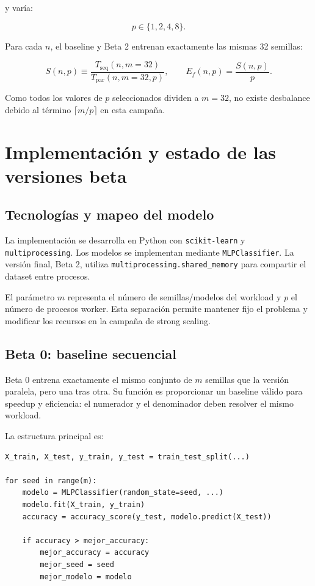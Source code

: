 \documentclass[11pt,a4paper]{article}
\newcommand{\Speedup}{S}
\newcommand{\Efficiency}{E_f}
\begin{document}
y varía:

\begin{equation}
    p\in\{1,2,4,8\}.
\end{equation}

Para cada $n$, el baseline y Beta 2 entrenan exactamente las mismas 32 semillas:

\begin{equation}
    \Speedup(n,p)
    \equiv
    \frac{T_{\mathrm{seq}}(n,m=32)}
         {T_{\mathrm{par}}(n,m=32,p)},
    \qquad
    \Efficiency(n,p)
    =
    \frac{\Speedup(n,p)}{p}.
    \label{eq:speedup-final}
\end{equation}

Como todos los valores de $p$ seleccionados dividen a $m=32$, no existe desbalance
debido al término $\lceil m/p\rceil$ en esta campaña.


\section{Implementación y estado de las versiones beta}

\subsection{Tecnologías y mapeo del modelo}

La implementación se desarrolla en Python con \texttt{scikit-learn} y
\texttt{multiprocessing}. Los modelos se implementan mediante
\texttt{MLPClassifier}. La versión final, Beta 2, utiliza
\texttt{multiprocessing.shared\_memory} para compartir el dataset entre procesos.

El parámetro $m$ representa el número de semillas/modelos del workload y $p$ el número
de procesos worker. Esta separación permite mantener fijo el problema y modificar los recursos en la campaña de strong scaling.

\subsection{Beta 0: baseline secuencial}

Beta 0 entrena exactamente el mismo conjunto de $m$ semillas que la versión paralela,
pero una tras otra. Su función es proporcionar un baseline válido para speedup y
eficiencia: el numerador y el denominador deben resolver el mismo workload.

La estructura principal es:

\begin{lstlisting}
X_train, X_test, y_train, y_test = train_test_split(...)

for seed in range(m):
    modelo = MLPClassifier(random_state=seed, ...)
    modelo.fit(X_train, y_train)
    accuracy = accuracy_score(y_test, modelo.predict(X_test))

    if accuracy > mejor_accuracy:
        mejor_accuracy = accuracy
        mejor_seed = seed
        mejor_modelo = modelo
\end{lstlisting}
\end{document}
